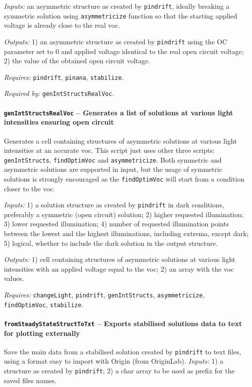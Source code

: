 		\textit{Inputs:} an asymmetric structure as created by \texttt{pin\-drift}, ideally
		breaking a symmetric solution using \texttt{asymmetricize} function so that
		the starting applied voltage is already close to the real \gls{voc}.

		\textit{Outputs:} 1) an asymmetric structure as created by \texttt{pin\-drift} using the OC
		parameter set to 0 and applied voltage identical to the real open
		circuit voltage;
		2) the value of the obtained open circuit voltage.

		\textit{Requires:} \texttt{pin\-drift}, \texttt{pinana}, \texttt{stabilize}.

		\textit{Required by:} \texttt{gen\-Int\-Structs\-Real\-Voc}.

		\paragraph{\texttt{gen\-Int\-Structs\-Real\-Voc} -- Generates a list of solutions at various light intensities ensuring open circuit}
		Generates a cell containing structures of asymmetric solutions at various light intensities at an accurate \gls{voc}.
		This script just uses other three scripts: \texttt{gen\-Int\-Structs}, \texttt{find\-Optim\-Voc}
		and \texttt{asymmetricize}. Both symmetric and asymmetric solutions are supported in input, but the usage of symmetric solutions is strongly encouraged as the \texttt{find\-Optim\-Voc} will start from a condition closer to the \gls{voc}.

		\textit{Inputs:} 1) a solution structure as created by \texttt{pin\-drift} in dark
		conditions, preferably a symmetric (open circuit) solution;
		2) higher requested illumination;
		3) lower requested illumination;
		4) number of requested illumination points between the lowest and the highest illuminations, including extrema, except dark;
		5) logical, whether to include the dark solution in the output
		structure.

		\textit{Outputs:} 1) cell containing structures of asymmetric solutions at various light
		intensities with an applied voltage equal to the \gls{voc};
		2) an array with the \gls{voc} values.

		\textit{Requires:} \texttt{change\-Light}, \texttt{pin\-drift}, \texttt{gen\-Int\-Structs},
		\texttt{asymmetricize}, \texttt{find\-Optim\-Voc}, \texttt{stabilize}.


		\paragraph{\texttt{from\-Steady\-State\-Struct\-To\-Txt} -- Exports stabilised solutions data to text for plotting externally}
		Save the main data from a stabilised solution created by \texttt{pin\-drift} to text files, using a format easy to import with Origin (from OriginLab).
		\textit{Inputs:} 1) a structure as created by \texttt{pin\-drift};
		2) a char array to be used as prefix for the saved files names.

